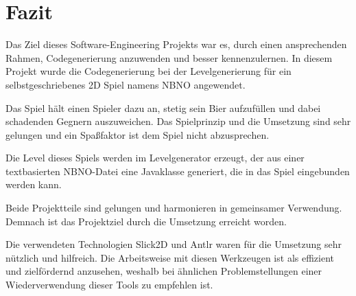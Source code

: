 \section{Fazit}

Das Ziel dieses Software-Engineering Projekts war es, durch einen ansprechenden Rahmen, Codegenerierung anzuwenden und besser kennenzulernen.
In diesem Projekt wurde die Codegenerierung bei der Levelgenerierung für ein selbstgeschriebenes 2D Spiel namens NBNO angewendet.

Das Spiel hält einen Spieler dazu an, stetig sein Bier aufzufüllen und dabei schadenden Gegnern auszuweichen.
Das Spielprinzip und die Umsetzung sind sehr gelungen und ein Spaßfaktor ist dem Spiel nicht abzusprechen.

Die Level dieses Spiels werden im Levelgenerator erzeugt, der aus einer textbasierten NBNO-Datei eine Javaklasse generiert, die in das Spiel eingebunden werden kann.

Beide Projektteile sind gelungen und harmonieren in gemeinsamer Verwendung. Demnach ist das Projektziel durch die Umsetzung erreicht worden.

Die verwendeten Technologien Slick2D und Antlr waren für die Umsetzung sehr nützlich und hilfreich.
Die Arbeitsweise mit diesen Werkzeugen ist als effizient und zielfördernd anzusehen, weshalb bei ähnlichen Problemstellungen einer Wiederverwendung dieser Tools zu empfehlen ist.